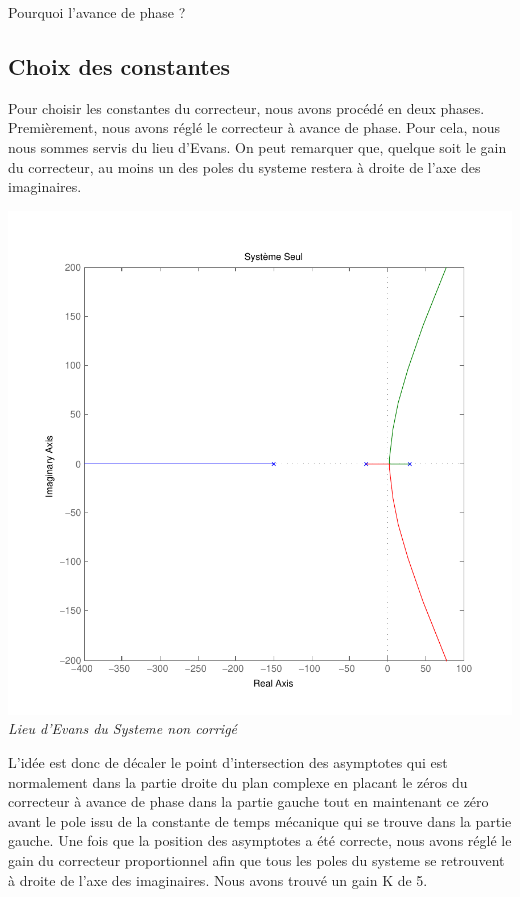 \documentclass[11pt, french]{article} %
\begin{document}
Pourquoi l'avance de phase ?

\vspace{0,2in}



\subsection{Choix des constantes}

Pour choisir les constantes du correcteur, nous avons procédé en deux phases. Premièrement, nous avons réglé le correcteur à avance de phase. Pour cela, nous nous sommes servis du lieu d'Evans. On peut remarquer que, quelque soit le gain du correcteur, au moins un des poles du systeme restera à droite de l'axe des imaginaires.

\newline
\begin{center}
\includegraphics [scale=0.50]{RL_Sys_Seul.pdf}
\\
\emph{Lieu d'Evans du Systeme non corrigé}
\end{center}

L'idée est donc de décaler le point d'intersection des asymptotes qui est normalement dans la partie droite du plan complexe en placant le zéros du correcteur à avance de phase dans la partie gauche tout en maintenant ce zéro avant le pole issu de la constante de temps mécanique qui se trouve dans la partie gauche. Une fois que la position des asymptotes a été correcte, nous avons réglé le gain du correcteur proportionnel afin que tous les poles du systeme se retrouvent à droite de l'axe des imaginaires. Nous avons trouvé un gain K de 5. 
\end{document}
